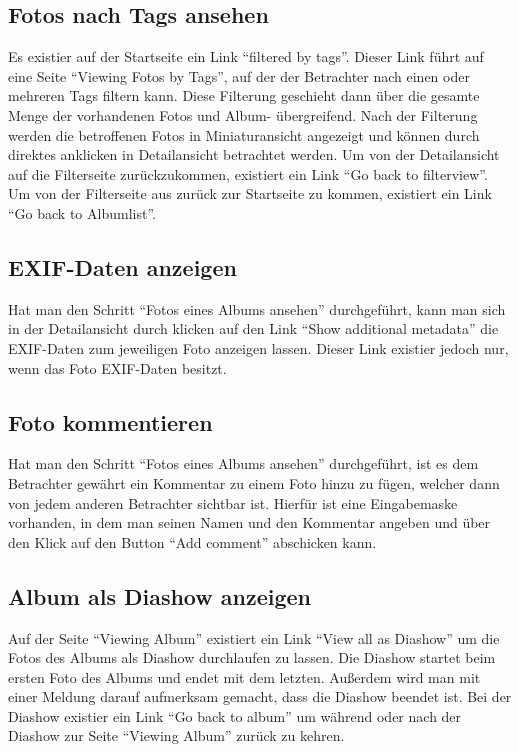 \documentclass[a4paper,12pt,liststotocnumbered]{scrartcl}
\begin{document}
\subsection{Fotos nach Tags ansehen}

Es existier auf der Startseite ein Link "`filtered by tags"'. Dieser
Link führt auf eine Seite "`Viewing Fotos by Tags"', auf der der
Betrachter nach einen oder mehreren Tags filtern kann.  Diese Filterung
geschieht dann über die gesamte Menge der vorhandenen Fotos und Album-
übergreifend. Nach der Filterung werden die betroffenen Fotos in
Miniaturansicht angezeigt und können durch direktes anklicken in
Detailansicht betrachtet werden.  Um von der Detailansicht auf die
Filterseite zurückzukommen, existiert ein Link "`Go back to
filterview"'.  Um von der Filterseite aus zurück zur Startseite zu
kommen, existiert ein Link "`Go back to Albumlist"'.

\subsection{EXIF-Daten anzeigen}

Hat man den Schritt "`Fotos eines Albums ansehen"' durchgeführt, kann
man sich in der Detailansicht durch klicken auf den Link "`Show
additional metadata"' die EXIF-Daten\cite{exifwp} zum jeweiligen
Foto anzeigen lassen. Dieser Link existier jedoch nur, wenn das Foto
EXIF-Daten besitzt.

\subsection{Foto kommentieren}

Hat man den Schritt "`Fotos eines Albums ansehen"' durchgeführt, ist es
dem Betrachter gewährt ein Kommentar zu einem Foto hinzu zu fügen,
welcher dann von jedem anderen Betrachter sichtbar ist. Hierfür ist eine
Eingabemaske vorhanden, in dem man seinen Namen und den Kommentar
angeben und über den Klick auf den Button "`Add comment"' abschicken
kann.

\subsection{Album als Diashow anzeigen}

Auf der Seite "`Viewing Album"' existiert ein Link "`View all as
Diashow"' um die Fotos des Albums als Diashow durchlaufen zu lassen. Die
Diashow startet beim ersten Foto des Albums und endet mit dem letzten.
Außerdem wird man mit einer Meldung darauf aufmerksam gemacht, dass die
Diashow beendet ist. Bei der Diashow existier ein Link "`Go back to
album"' um während oder nach der Diashow zur Seite "`Viewing Album"'
zurück zu kehren.
\end{document}
